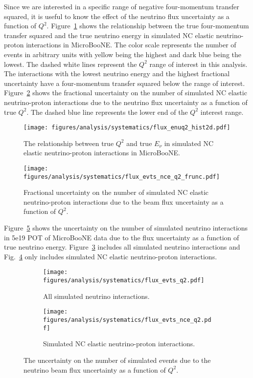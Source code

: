     Since we are interested in a specific range of negative four-momentum
    transfer squared, it is useful to know the effect of the neutrino flux
    uncertainty as a function of $Q^2$. Figure~\ref{fig:qevenu} shows the
    relationship between the true four-momentum transfer squared and the true
    neutrino energy in simulated NC elastic neutrino-proton interactions in
    MicroBooNE. The color scale represents the number of events in arbitrary
    units with yellow being the highest and dark blue being the lowest. The
    dashed white lines represent the $Q^2$ range of interest in this analysis.
    The interactions with the lowest neutrino energy and the highest fractional
    uncertainty have a four-momentum transfer squared below the range of
    interest. Figure~\ref{fig:q2frac} shows the fractional uncertainty on the
    number of simulated NC elastic neutrino-proton interactions due to the
    neutrino flux uncertainty as a function of true $Q^2$. The dashed blue line
    represents the lower end of the $Q^2$ interest range.
    \begin{figure}[ht]
      \centering
      \texttt{[image: figures/analysis/systematics/flux\_enuq2\_hist2d.pdf]}
      \caption{The relationship between true $Q^2$ and true $E_{\nu}$ in
      simulated NC elastic neutrino-proton interactions in MicroBooNE.}
      \label{fig:qevenu}
    \end{figure}
    \begin{figure}[ht]
      \centering
      \texttt{[image: figures/analysis/systematics/flux\_evts\_nce\_q2\_frunc.pdf]}
      \caption{Fractional uncertainty on the number of simulated NC elastic
      neutrino-proton interactions due to the beam flux uncertainty as a
      function of $Q^2$.}
      \label{fig:q2frac}
    \end{figure}
    Figure~\ref{fig:fluxq2} shows the uncertainty on the number of simulated
    neutrino interactions in 5e19 POT of MicroBooNE data due to the flux
    uncertainty as a function of true neutrino energy.
    Figure~\ref{fig:fluxq2all} includes all simulated neutrino interactions and
    Fig.~\ref{fig:fluxq2nce} only includes simulated NC elastic neutrino-proton
    interactions.
    \begin{figure}[h]
      \centering
      \begin{subfigure}[t]{2.8in}
        \texttt{[image: figures/analysis/systematics/flux\_evts\_q2.pdf]}
        \caption{All simulated neutrino interactions.}
        \label{fig:fluxq2all}
      \end{subfigure}
      \hspace{2pt}
      \begin{subfigure}[t]{2.8in}
        \texttt{[image: figures/analysis/systematics/flux\_evts\_nce\_q2.pdf]}
        \caption{Simulated NC elastic neutrino-proton interactions.}
        \label{fig:fluxq2nce}
      \end{subfigure}
      \caption{The uncertainty on the number of simulated events due to the
      neutrino beam flux uncertainty as a function of $Q^2$.}
      \label{fig:fluxq2}
    \end{figure}

